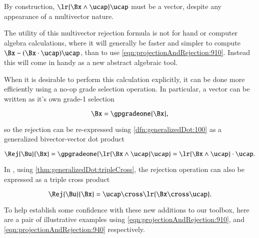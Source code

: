 By construction,
\( \lr{ \Bx \wedge \ucap } \ucap \) must be a vector, despite any appearance of a multivector nature.

The utility of this multivector rejection formula is not for hand or computer algebra calculations, where it will generally be faster and simpler to compute \( \Bx - (\Bx \cdot \ucap) \ucap \), than to use \cref{eqn:projectionAndRejection:910}.
Instead this will come in handy as a new abstract algebraic tool.

When it is desirable to perform this calculation explicitly, it can be done more efficiently using a no-op grade selection operation.
In particular, a vector can be written as it's own grade-1 selection

\begin{dmath}\label{eqn:projectionAndRejection:920}
\Bx = \gpgradeone{ \Bx },
\end{dmath}

so the rejection can be re-expressed
using \cref{dfn:generalizedDot:100}
as a generalized bivector-vector dot product

\begin{equation}\label{eqn:projectionAndRejection:940}
\Rej{\Bu}{\Bx}
= \gpgradeone{ \lr{ \Bx \wedge \ucap } \ucap }
= \lr{ \Bx \wedge \ucap } \cdot \ucap.
\end{equation}

In , using \cref{thm:generalizedDot:tripleCross}, the rejection operation can also be expressed as a triple cross product

\begin{dmath}\label{eqn:projectionAndRejection:1140}
\Rej{\Bu}{\Bx}
= \ucap \cross \lr{ \Bx \cross \ucap }.
\end{dmath}

To help establish some confidence with these new additions to our toolbox, here are a
pair of illustrative examples using
\cref{eqn:projectionAndRejection:910}, and
\cref{eqn:projectionAndRejection:940} respectively.


